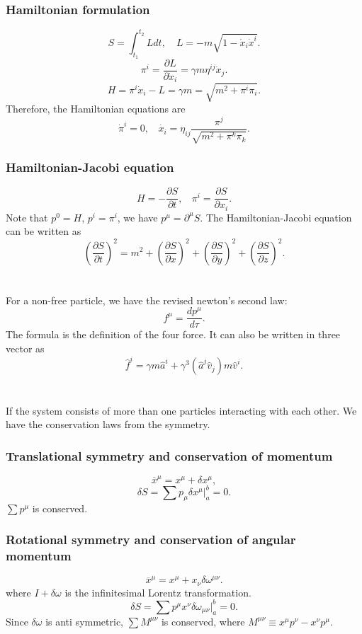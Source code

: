 \subsubsection{Hamiltonian formulation}
\[S = \int_{t_1}^{t_2} L dt , \quad L = - m \sqrt{1-\dot{x}_i\dot{x}^i}.\]
\[\pi^i = \frac{\partial L}{\partial \dot{x}_i} = \gamma m \eta^{ij}\dot{x}_j.\]
\[H = \pi^i \dot{x}_i - L = \gamma m = \sqrt{m^2 + \pi^i \pi_i}.\]
Therefore, the Hamiltonian equations are
\[\dot{\pi}^i = 0, \ \ \ \ \dot{x_i} = \eta_{ij}\frac{\pi^j}{\sqrt{m^2 + \pi^k \pi_k}}.\]
\subsubsection{Hamiltonian-Jacobi equation}
\[H = -\frac{\partial S}{\partial t}, \ \ \ \ \pi^i = \frac{\partial S}{\partial x_i}.\]
Note that $p^0 = H$, $p^i = \pi^i$, we have $p^{\mu} = \partial^{\mu} S$. The Hamiltonian-Jacobi equation can be written as
\[\left(\frac{\partial S}{\partial t}\right)^2 = m^2 + \left(\frac{\partial S}{\partial x}\right)^2 + \left(\frac{\partial S}{\partial y}\right)^2 + \left(\frac{\partial S}{\partial z}\right)^2.\]
\\ \\
For a non-free particle, we have the revised newton's second law:
\[f^{\mu} = \frac{dp^{\mu}}{d\tau}.\]
The formula is the definition of the four force. It can also be written in three vector as
\[\hat{f}^i = \gamma m \hat{a}^i + \gamma^3 (\hat{a}^j \hat{v}_j) m \hat{v}^i.\]
\\ \\
If the system consists of more than one particles interacting with each other. We have the conservation laws from the symmetry.
\subsubsection{Translational symmetry and conservation of momentum}
\[\overline{x}^{\mu} = x^{\mu} + \delta x^{\mu},\]
\[\delta S = \sum p_{\mu} \delta x^{\mu}|_a^b = 0 .\]
$\sum p^{\mu}$ is conserved.
\subsubsection{Rotational symmetry and conservation of angular momentum}
\[\overline{x}^{\mu} = x^{\mu} + x_{\nu}\delta \omega^{\mu \nu}.\]
where $I+\delta \omega$ is the infinitesimal Lorentz transformation.
\[\delta S = \sum p^{\mu} x^{\nu} \delta \omega_{\mu \nu}|_a^b = 0 .\]
Since $\delta \omega$ is anti symmetric, $\sum M^{\mu \nu} $ is conserved, where $M^{\mu \nu} \equiv x^{\mu}p^{\nu} - x^{\nu}p^{\mu}$.

